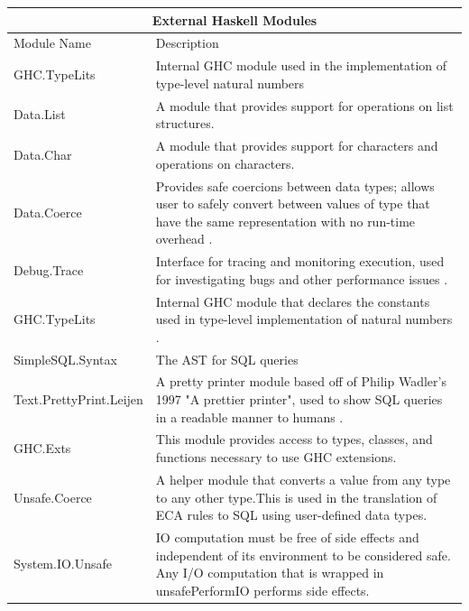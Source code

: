 \documentclass[12pt]{report}
\begin{document}
\begin{adjustbox}{center}
\begin{tabular}{ |p{3.2cm}|p{11cm}|  }
    \hline
    \multicolumn{2}{|c|}{External Haskell Modules} \\
    \hline\hline
    Module Name & Description\\
    \hline
    GHC.TypeLits   & Internal GHC module used in the implementation of 
    type-level natural numbers \cite{hackage}    \\ 
    \hline
    Data.List & A module that provides support for operations on list 
    structures.  \\
    \hline
    Data.Char &  A module that provides support for characters and operations 
    on characters.  \\
    \hline
    Data.Coerce  & Provides safe coercions between data types; allows user to 
    safely convert between values of type that have the same representation 
    with no run-time overhead \cite{hackage}.\\
    \hline
    Debug.Trace &  Interface for tracing and monitoring execution, used for 
    investigating bugs and other performance issues \cite{hackage}. \\ 
    \hline 
    GHC.TypeLits & Internal GHC module that declares the constants used in 
    type-level implementation of natural numbers \cite{hackage}.  \\ 
    \hline  
    SimpleSQL.Syntax&   The AST for SQL queries \cite{hackage}\\ 
    \hline
    Text.PrettyPrint.Leijen & A pretty printer module based 
    off of Philip Wadler's 1997 "A prettier printer", used to show SQL queries 
    in a readable manner to humans \cite{hackage}.\\ 
    \hline
    GHC.Exts & This module provides access to types, classes, and functions 
    necessary to use GHC extensions. \\ 
    \hline
    Unsafe.Coerce &  A helper module that converts a value from any type to any 
    other type.This is used in the translation of ECA rules to SQL using 
    user-defined data types. \\ 
    \hline
     System.IO.Unsafe & IO computation must be free of side effects and 
     independent of its environment to be considered safe. Any I/O computation 
     that is wrapped in unsafePerformIO performs side effects. \\
    \hline
\end{tabular}
\end{adjustbox}
\end{document}
